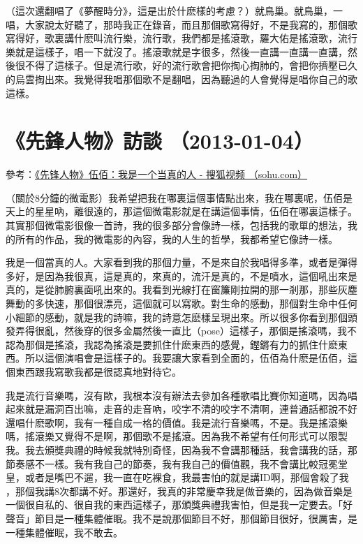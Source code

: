 \documentclass[UTF8,a4paper,oneside,twocolumn,12pt]{ctexbook}
\begin{document}
（這次還翻唱了《夢醒時分》，這是出於什麽樣的考慮？）就鳥巢。就鳥巢，一唱，大家說太好聽了，那時我正在錄音，而且那個歌寫得好，不是我寫的，那個歌寫得好，歌裏講什麽叫流行樂，流行歌，我們都是搖滾歌，羅大佑是搖滾歌，流行樂就是這樣子，唱一下就沒了。搖滾歌就是字很多，然後一直講一直講一直講，然後很不得了這樣子。但是流行歌，好的流行歌會把你掏心掏肺的，會把你擠壓已久的烏雲掏出來。我覺得我唱那個歌不是翻唱，因為聽過的人會覺得是唱你自己的歌這樣。

\section{《先鋒人物》訪談 （2013-01-04）}
參考：\href{https://tv.sohu.com/v/MjAxMzAxMDQvbjM2MjMwNjQ1NC5zaHRtbA==.html}{《先锋人物》伍佰：我是一个当真的人 - 搜狐视频 （sohu.com）}

（關於8分鐘的微電影）我希望把我在哪裏這個事情點出來，我在哪裏呢，伍佰是天上的星星吶，離很遠的，那這個微電影就是在講這個事情，伍佰在哪裏這樣子。其實那個微電影很像一首詩，我的很多部分會像詩一樣，包括我的歌單的想法，我的所有的作品，我的微電影的內容，我的人生的哲學，我都希望它像詩一樣。

我是一個當真的人。大家看到我的那個力量，不是來自於我唱得多準，或者是彈得多好，是因為我很真，這是真的，來真的，流汗是真的，不是噴水，這個吼出來是真的，是從肺腑裏面吼出來的。我看到光線打在窗簾剛拉開的那一剎那，那些灰塵舞動的多快速，那個很漂亮，這個就可以寫歌。對生命的感動，那個對生命中任何小細節的感動，就是我的詩嘛，我的詩意怎麽樣呈現出來。所以很多你看到那個頭發弄得很亂，然後穿的很多金屬然後一直比（pose）這樣子，那個是搖滾嗎，我不認為那個是搖滾，我認為搖滾是要抓住什麽東西的感覺，鏗鏘有力的抓住什麽東西。所以這個演唱會是這樣子的。我要讓大家看到全面的，伍佰為什麽是伍佰，這個東西跟我寫歌我都是很認真地對待它。

我是流行音樂嗎，沒有歐，我根本沒有辦法去參加各種歌唱比賽你知道嗎，因為唱起來就是漏洞百出嘛，走音的走音吶，咬字不清的咬字不清啊，連普通話都說不好還唱什麽歌啊，我有一種自成一格的價值。我是流行音樂嗎，不是。我是搖滾樂嗎，搖滾樂又覺得不是啊，那個歌不是搖滾。因為我不希望有任何形式可以限製我。我去頒獎典禮的時候我就特別奇怪，因為我不會講那種話，我會講我的話，那節奏感不一樣。我有我自己的節奏，我有我自己的價值觀，我不會講比較冠冕堂皇，或者是嘴巴不遛，我一直在吃裸食，我最害怕的就是講ID啊，那個會殺了我 ，那個我講8次都講不好。那還好，我真的非常慶幸我是做音樂的，因為做音樂是一個很自私的、很自我的東西這樣子，那頒獎典禮我害怕，但是我一定要去。「好聲音」節目是一種集體催眠。我不是說那個節目不好，那個節目很好，很厲害，是一種集體催眠，我不敢去。
\end{document}
